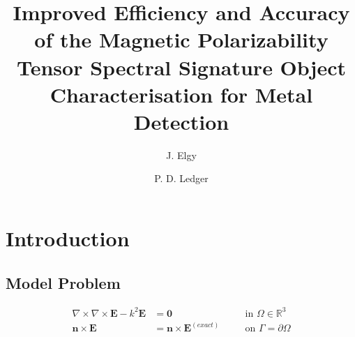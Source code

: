 \documentclass[a4paper,12]{elsarticle}
\theoremstyle{definition}
\newcommand{\curl}{\nabla \times}
\begin{document}

\begin{frontmatter}

\title{Improved Efficiency and Accuracy of the Magnetic Polarizability Tensor Spectral Signature Object Characterisation for Metal Detection}
%
\cortext[cor1]{*}
 
\author[1]{J. Elgy} 
\author[1]{P. D. Ledger} 


\begin{abstract}

\end{abstract}

\begin{keyword} 
\end{keyword}

\end{frontmatter}

\section{Introduction}\label{sect:intro}

\subsection{Model Problem}
\begin{equation}
\begin{alignedat}{2}
\curl \curl \boldsymbol{E} - k^2\boldsymbol{E} &= \boldsymbol{0} &&\quad \text{in } \Omega \in \mathbb{R}^3 \\
\boldsymbol{n} \times \boldsymbol{E} &= \boldsymbol{n} \times \boldsymbol{E}^{(exact)} &&\quad \text{on } \Gamma = \partial \Omega
\end{alignedat}
\end{equation}
\end{document}
